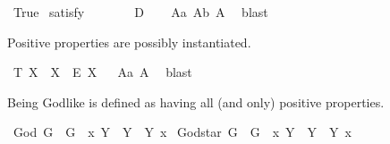 \begin{isabellebody}
\isanewline
\isanewline
{}\isamarkupfalse%
\ True\ \isamarkupfalse%
{\isacharbrackleft}satisfy{\isacharbrackright}%
\ %
%
\isamarkupfalse%
\ \ \ \ %
%
%
%
\isanewline
{}\isamarkupfalse%
\ {\isachardoublequoteopen}{\isasymlfloor}D{\isasymrfloor}{\isachardoublequoteclose}%
\ \ %
%
\isamarkupfalse%
\ A{}a\ A{}b\ A{}\ \isamarkupfalse%
\ blast\ %
%
%
%
%
\begin{isamarkuptext}%
Positive properties are possibly instantiated.%
\end{isamarkuptext}\isamarkuptrue%
\isamarkupfalse%
\ T{}{\isacharcolon}\ {\isachardoublequoteopen}{\isasymlfloor}\isactrlbold {\isasymforall}X{\isachardot}\ {\isasymP}\ X\ \isactrlbold {\isasymrightarrow}\ \isactrlbold {\isasymdiamond}\isactrlbold {\isasymexists}\isactrlsup E\ X{\isasymrfloor}{\isachardoublequoteclose}%
\ %
%
\isamarkupfalse%
\ A{}a\ A{}\ \isamarkupfalse%
\ blast%
%
%
%
\begin{isamarkuptext}%
Being Godlike is defined as having all (and only) positive properties.%
\end{isamarkuptext}\isamarkuptrue%
\isamarkupfalse%
\ God{\isacharcolon}{\isacharcolon}{\isachardoublequoteopen}{\isasymup}{\isasymlangle}{\isasymzero}{\isasymrangle}{\isachardoublequoteclose}\ {\isacharparenleft}{\isachardoublequoteopen}G{\isachardoublequoteclose}{\isacharparenright}\ \ {\isachardoublequoteopen}G\ {\isasymequiv}\ {\isacharparenleft}{\isasymlambda}x{\isachardot}\ \isactrlbold {\isasymforall}Y{\isachardot}\ {\isasymP}\ Y\ \isactrlbold {\isasymrightarrow}\ Y\ x{\isacharparenright}{\isachardoublequoteclose}\isanewline
{}\isamarkupfalse%
\ God{\isacharunderscore}star{\isacharcolon}{\isacharcolon}{\isachardoublequoteopen}{\isasymup}{\isasymlangle}{\isasymzero}{\isasymrangle}{\isachardoublequoteclose}\ {\isacharparenleft}{\isachardoublequoteopen}G{\isacharasterisk}{\isachardoublequoteclose}{\isacharparenright}\ \ {\isachardoublequoteopen}G{\isacharasterisk}\ {\isasymequiv}\ {\isacharparenleft}{\isasymlambda}x{\isachardot}\ \isactrlbold {\isasymforall}Y{\isachardot}\ {\isasymP}\ Y\ \isactrlbold {\isasymleftrightarrow}\ Y\ x{\isacharparenright}{\isachardoublequoteclose}%

\end{isabellebody}
